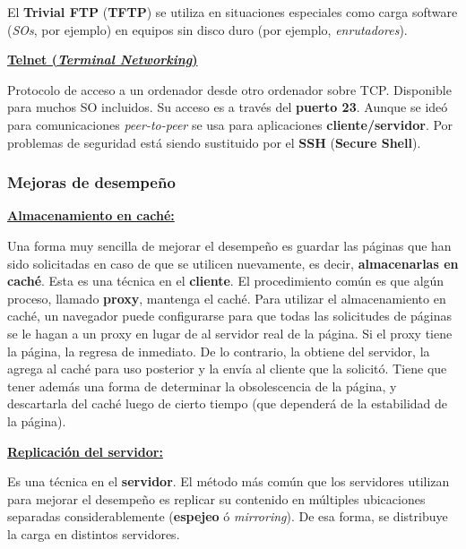 \documentclass[10pt,a4paper]{article}
\begin{document}
El \textbf{Trivial FTP} (\textbf{TFTP}) se utiliza en situaciones especiales como carga software (\textit{SOs}, por ejemplo) en equipos sin disco duro (por ejemplo, \textit{enrutadores}).

\underline{\textbf{Telnet (\textit{Terminal Networking})}}

Protocolo de acceso a un ordenador desde otro ordenador sobre TCP. Disponible para muchos SO incluidos. Su acceso es a través del \textbf{puerto 23}. Aunque se ideó para comunicaciones \textit{peer-to-peer} se usa para aplicaciones \textbf{cliente/servidor}. Por problemas de seguridad está siendo sustituido por el \textbf{SSH} (\textbf{Secure Shell}).

\subsubsection{Mejoras de desempeño}

\underline{\textbf{Almacenamiento en caché:}}

Una forma muy sencilla de mejorar el desempeño es guardar las páginas que han sido solicitadas en caso de que se utilicen nuevamente, es decir, \textbf{almacenarlas en caché}. Esta es una técnica en el \textbf{cliente}. El procedimiento común es que algún proceso, llamado \textbf{proxy}, mantenga el caché. Para utilizar el almacenamiento en caché, un navegador puede configurarse para que todas las solicitudes de páginas se le hagan a un proxy en lugar de al servidor real de la página. Si el proxy tiene la página, la regresa de inmediato. De lo contrario, la obtiene del servidor, la agrega al caché para uso posterior y la envía al cliente que la solicitó. Tiene que tener además una forma de determinar la obsolescencia de la página, y descartarla del caché luego de cierto tiempo (que dependerá de la estabilidad de la página).

\underline{\textbf{Replicación del servidor:}}

Es una técnica en el \textbf{servidor}. El método más común que los servidores utilizan para mejorar el desempeño es replicar su contenido en múltiples ubicaciones separadas considerablemente (\textbf{espejeo} ó \textit{mirroring}). De esa forma, se distribuye la carga en distintos servidores.
\end{document}
